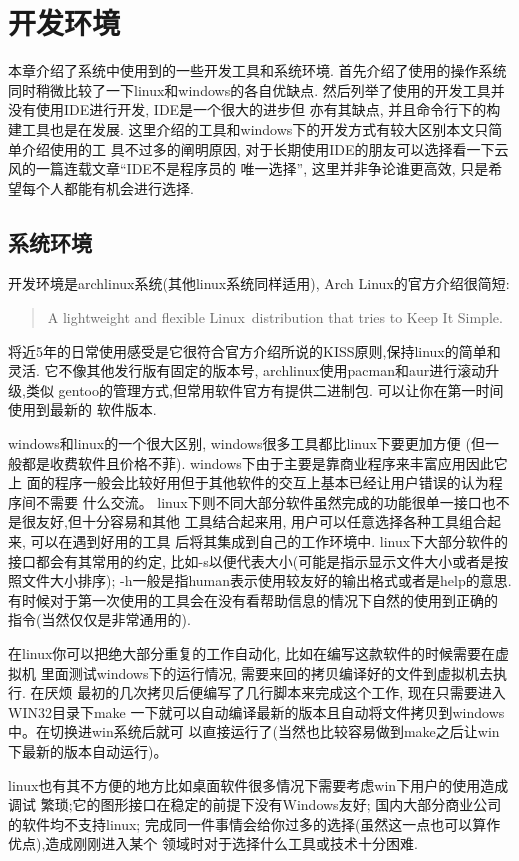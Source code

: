 \chapter{开发环境}
本章介绍了系统中使用到的一些开发工具和系统环境.
首先介绍了使用的操作系统同时稍微比较了一下linux和windows的各自优缺点.
然后列举了使用的开发工具并没有使用IDE进行开发, IDE是一个很大的进步但
亦有其缺点, 并且命令行下的构建工具也是在发展. 
这里介绍的工具和windows下的开发方式有较大区别本文只简单介绍使用的工
具不过多的阐明原因,
对于长期使用IDE的朋友可以选择看一下云风的一篇连载文章``IDE不是程序员的
唯一选择'', 这里并非争论谁更高效, 只是希望每个人都能有机会进行选择.

\section{系统环境}
开发环境是archlinux系统(其他linux系统同样适用), 
Arch Linux的官方介绍很简短:
\begin{quote}
A lightweight and flexible Linux\textregistered \ distribution that tries to
Keep It Simple.
\end{quote}
将近5年的日常使用感受是它很符合官方介绍所说的KISS原则,保持linux的简单和灵活.
它不像其他发行版有固定的版本号, archlinux使用pacman和aur进行滚动升级,类似
gentoo的管理方式,但常用软件官方有提供二进制包. 可以让你在第一时间使用到最新的
软件版本.

windows和linux的一个很大区别, windows很多工具都比linux下要更加方便
(但一般都是收费软件且价格不菲). windows下由于主要是靠商业程序来丰富应用因此它上
面的程序一般会比较好用但于其他软件的交互上基本已经让用户错误的认为程序间不需要
什么交流。 
linux下则不同大部分软件虽然完成的功能很单一接口也不是很友好,但十分容易和其他
工具结合起来用, 用户可以任意选择各种工具组合起来, 可以在遇到好用的工具
后将其集成到自己的工作环境中. linux下大部分软件的接口都会有其常用的约定,
比如-s以便代表大小(可能是指示显示文件大小或者是按照文件大小排序);
-h一般是指human表示使用较友好的输出格式或者是help的意思. 
有时候对于第一次使用的工具会在没有看帮助信息的情况下自然的使用到正确的
指令(当然仅仅是非常通用的).

在linux你可以把绝大部分重复的工作自动化, 比如在编写这款软件的时候需要在虚拟机
里面测试windows下的运行情况, 需要来回的拷贝编译好的文件到虚拟机去执行. 在厌烦
最初的几次拷贝后便编写了几行脚本来完成这个工作, 现在只需要进入WIN32目录下make
一下就可以自动编译最新的版本且自动将文件拷贝到windows中。在切换进win系统后就可
以直接运行了(当然也比较容易做到make之后让win下最新的版本自动运行)。

linux也有其不方便的地方比如桌面软件很多情况下需要考虑win下用户的使用造成调试
繁琐;它的图形接口在稳定的前提下没有Windows友好; 
国内大部分商业公司的软件均不支持linux;
完成同一件事情会给你过多的选择(虽然这一点也可以算作优点),造成刚刚进入某个
领域时对于选择什么工具或技术十分困难. 

